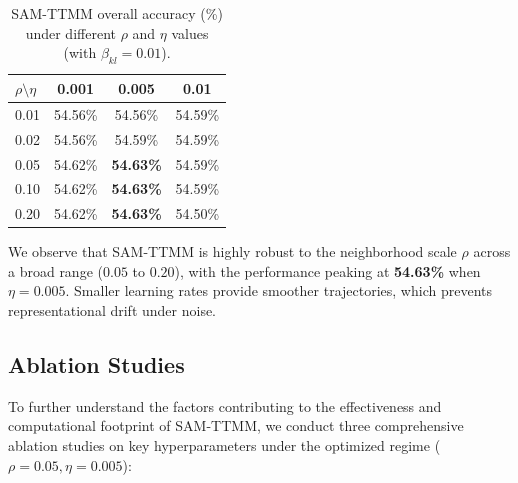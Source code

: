 \documentclass{article}
\theoremstyle{plain}
\theoremstyle{definition}
\theoremstyle{remark}
\begin{document}
\begin{table}[h]
\caption{SAM-TTMM overall accuracy (\%) under different $\rho$ and $\eta$ values (with $\beta_{kl}=0.01$).}
\label{tab:hyper}
\vskip 0.15in
\begin{center}
\begin{small}
\begin{sc}
\begin{tabular}{lccc}
\toprule
$\rho \setminus \eta$ & 0.001 & 0.005 & 0.01 \\
\midrule
0.01 & 54.56\% & 54.56\% & 54.59\% \\
0.02 & 54.56\% & 54.59\% & 54.59\% \\
0.05 & 54.62\% & \textbf{54.63\%} & 54.59\% \\
0.10 & 54.62\% & \textbf{54.63\%} & 54.59\% \\
0.20 & 54.62\% & \textbf{54.63\%} & 54.50\% \\
\bottomrule
\end{tabular}
\end{sc}
\end{small}
\end{center}
\vskip -0.1in
\end{table}

We observe that SAM-TTMM is highly robust to the neighborhood scale $\rho$ across a broad range ($0.05$ to $0.20$), with the performance peaking at \textbf{54.63\%} when $\eta = 0.005$. Smaller learning rates provide smoother trajectories, which prevents representational drift under noise.

\subsection{Ablation Studies}
To further understand the factors contributing to the effectiveness and computational footprint of SAM-TTMM, we conduct three comprehensive ablation studies on key hyperparameters under the optimized regime ($\rho=0.05, \eta=0.005$):
\end{document}
